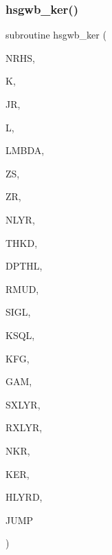 \subsubsection{\texorpdfstring{hsgwb\+\_\+ker()}{hsgwb\_ker()}}
{\footnotesize\ttfamily subroutine hsgwb\+\_\+ker (\begin{DoxyParamCaption}\item[{integer}]{N\+R\+HS,  }\item[{integer}]{K,  }\item[{integer}]{JR,  }\item[{integer}]{L,  }\item[{real(kind=ql)}]{L\+M\+B\+DA,  }\item[{real(kind=ql)}]{ZS,  }\item[{real(kind=ql)}]{ZR,  }\item[{integer}]{N\+L\+YR,  }\item[{real(kind=ql), dimension (nlyr)}]{T\+H\+KD,  }\item[{real(kind=ql), dimension (nlyr)}]{D\+P\+T\+HL,  }\item[{real(kind=ql), dimension(0\+:nlyr)}]{R\+M\+UD,  }\item[{complex(kind=ql), dimension (nlyr)}]{S\+I\+GL,  }\item[{complex(kind=ql), dimension (nlyr)}]{K\+S\+QL,  }\item[{integer}]{K\+FG,  }\item[{integer}]{G\+AM,  }\item[{integer}]{S\+X\+L\+YR,  }\item[{integer}]{R\+X\+L\+YR,  }\item[{integer}]{N\+KR,  }\item[{complex(kind=ql), dimension(jnlo-\/nrhs\+:jnhi,nkr)}]{K\+ER,  }\item[{complex(kind=ql), dimension(nrhs,nkr)}]{H\+L\+Y\+RD,  }\item[{logical}]{J\+U\+MP }\end{DoxyParamCaption})}

